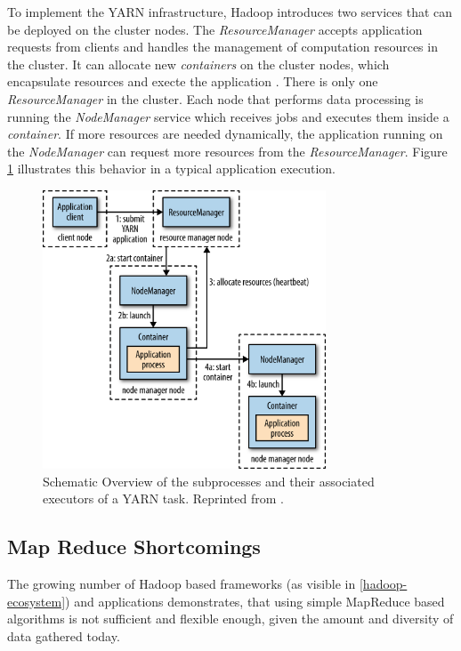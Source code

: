 To implement the \ac{YARN} infrastructure, Hadoop introduces two services that can be deployed on the cluster nodes.
The \emph{ResourceManager} accepts application requests from clients and handles the management of computation resources in the cluster.
It can allocate new \emph{containers} on the cluster nodes, which encapsulate resources and execte the application .
There is only one \emph{ResourceManager} in the cluster.
Each node that performs data processing is running the \emph{NodeManager} service which receives jobs and executes them inside a \emph{container}.
If more resources are needed dynamically, the application running on the \emph{NodeManager} can request more resources from the \emph{ResourceManager}.
Figure \ref{fig:yarn} illustrates this behavior in a typical application execution.

\begin{figure}[htb]
     {\centering\includegraphics[width=0.75\textwidth]{img/hddg_0402.png}\par}
	\caption{Schematic Overview of the subprocesses and their associated executors of a \ac{YARN} task. Reprinted from \textcite[][Chap.~4]{white2015hadoop}.}
	\label{fig:yarn}
\end{figure}

\subsection{Map Reduce Shortcomings}
\label{sec:fund:mapred_shortcomings}

The growing number of Hadoop based frameworks (as visible in \ref{hadoop-ecosystem}) and applications demonstrates, that using simple MapReduce based algorithms is not sufficient and flexible enough, given the amount and diversity of data gathered today.

